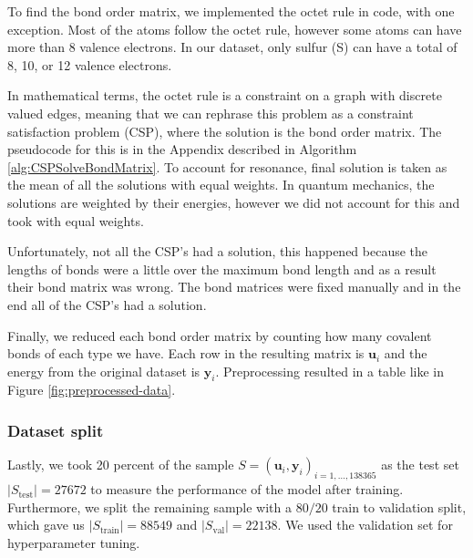 To find the bond order matrix, we implemented the octet rule in code, with one exception.
Most of the atoms follow the octet rule, however some atoms can have more than 8 valence electrons. In our dataset, only sulfur (S) can have a total of 8, 10, or 12 valence electrons.

In mathematical terms, the octet rule is a constraint on a graph with discrete valued edges, meaning that we can rephrase this problem as a constraint satisfaction problem (CSP), where the solution is the bond order matrix. The pseudocode for this is in the Appendix described in Algorithm \ref{alg:CSPSolveBondMatrix}. To account for resonance, final solution is taken as the mean of all the solutions with equal weights. In quantum mechanics, the solutions are weighted by their energies, however we did not account for this and took with equal weights.

Unfortunately, not all the CSP's had a solution, this happened because the lengths of bonds were a little over the maximum bond length and as a result their bond matrix was wrong. The bond matrices were fixed manually and in the end all of the CSP's had a solution.

Finally, we reduced each bond order matrix by counting how many covalent bonds of each type we have. Each row in the resulting matrix is $\textbf{u}_i$ and the energy from the original dataset is $\textbf{y}_i$. Preprocessing resulted in a table like in Figure \ref{fig:preprocessed-data}.

\begin{Figure}
    \centering
    
    \captionsetup{width=.9\linewidth}
    \label{fig:preprocessed-data}
\end{Figure}

\subsubsection{Dataset split}

Lastly, we took 20 percent of the sample $S = (\textbf{u}_i, \textbf{y}_i)_{i=1, \dots, 138365}$ as the test set $|S_{\text{test}}| = 27672$ to measure the performance of the model after training. Furthermore, we split the remaining sample with a $80/20$ train to validation split, which gave us $|S_{\text{train}}| = 88549$ and $|S_{\text{val}}| = 22138$. We used the validation set for hyperparameter tuning.